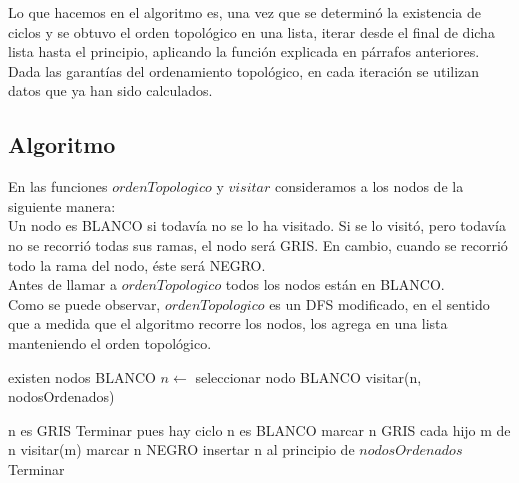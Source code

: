 \quad Lo que hacemos en el algoritmo es, una vez que se determinó la existencia de ciclos y se obtuvo el orden topológico en una lista, iterar desde el final de dicha lista hasta el principio, aplicando la función explicada en párrafos anteriores. Dada las garantías del ordenamiento topológico, en cada iteración se utilizan datos que ya han sido calculados.



 

\subsection{Algoritmo}

\indent En las funciones $ordenTopologico$ y $visitar$ consideramos a los nodos de la siguiente manera:\\
\indent Un nodo es BLANCO si todavía no se lo ha visitado. Si se lo visitó, pero todavía no se recorrió todas sus ramas, el nodo será GRIS. En cambio, cuando se recorrió todo la rama del nodo, éste será NEGRO.\\
\indent Antes de llamar a $ordenTopologico$ todos los nodos están en BLANCO. \\
\indent Como se puede observar, $ordenTopologico$ es un DFS modificado, en el sentido que a medida que el algoritmo recorre los nodos, los agrega en una lista manteniendo el orden topológico.\\


\begin{algorithm}[H]
\caption{} 
\begin{codebox}
\li \While existen nodos BLANCO \Do
\li	$n \gets$ seleccionar nodo BLANCO
\li	visitar(n, nodosOrdenados)

\End
\end{codebox}
\end{algorithm}


\begin{algorithm}[H]
\caption{} 
\begin{codebox}
\li \If n es GRIS \Do
\li 	 Terminar pues hay ciclo
\li \End
\li \If n es BLANCO \Do
\li 	marcar n GRIS
\li		\For cada hijo m de n \Do
\li			visitar(m)			
\li		\End
\li		marcar n NEGRO
\li 		insertar n al principio de $nodosOrdenados$
\li 		Terminar
\li \End

\End
\end{codebox}
\end{algorithm}
 


